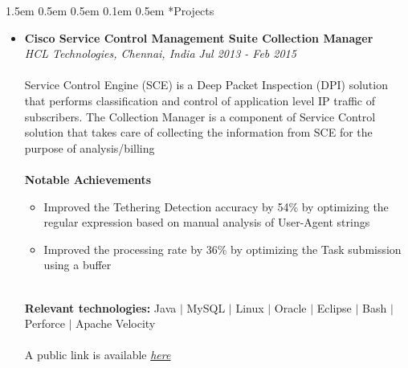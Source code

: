 \documentclass[a4paper, 12pt]{article}
\makeatletter
\renewcommand\section{\@startsection{section}{1}{\z@}%
                                  {1.5em \@plus 0.5em \@minus 0.5em}%
                                  {0.1em \@plus 0.5em}%
                                  {\small\bfseries\sc}}
\makeatother
\begin{document}
\section*{Projects}
\begin{adjustwidth}{1.3em}{0pt}
\begin{itemize}
  \item \textbf{Cisco Service Control Management Suite Collection Manager}\\
        \textsl{HCL Technologies, Chennai, India} \hfill
        \emph{Jul 2013 - Feb 2015}\\
        \\
        Service Control Engine (SCE) is a Deep Packet Inspection (DPI) solution
        that performs classification and control of application level IP traffic
        of subscribers. The Collection Manager is a component of Service Control
        solution that takes care of collecting the information from SCE for the
        purpose of analysis/billing\\
        \\
        \textbf{\small{Notable Achievements}}
        \begin{itemize}
          \item Improved the Tethering Detection accuracy by 54\% by optimizing
                the regular expression based on manual analysis of User-Agent
                strings
          \item Improved the processing rate by 36\% by optimizing the Task
                submission using a buffer
        \end{itemize}
        \vspace{1em}
        \\
        \textbf{\small{Relevant technologies:}} Java $|$ MySQL $|$ Linux $|$
        Oracle $|$ Eclipse $|$ Bash $|$ Perforce $|$ Apache Velocity\\
        \\
        A public link is available \href{http://www.cisco.com/c/en/us/products/service-exchange/sce-8000-series-service}{\emph{here}}\\


\end{itemize}
\end{adjustwidth}
\end{document}
